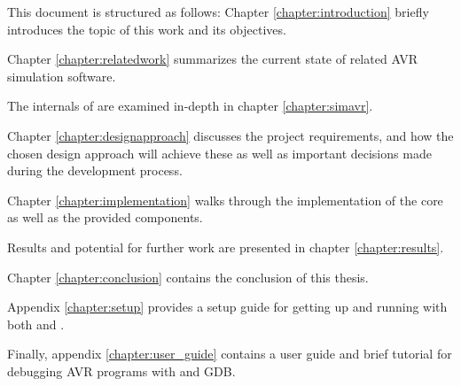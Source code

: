 This document is structured as follows: Chapter \ref{chapter:introduction} briefly
introduces the topic of this work and its objectives.


Chapter \ref{chapter:relatedwork} summarizes the current state of related \ac{AVR}
simulation software.

The internals of \simavr are examined in-depth in chapter \ref{chapter:simavr}.

Chapter \ref{chapter:designapproach} discusses the project requirements, and
how the chosen design approach will achieve these as well as important decisions
made during the development process.

Chapter \ref{chapter:implementation} walks through the implementation of the
\qsimavr core as well as the provided components.

Results and potential for further work are presented in chapter \ref{chapter:results}.

Chapter \ref{chapter:conclusion} contains the conclusion of this thesis.

Appendix \ref{chapter:setup} provides a setup guide for getting up and running
with both \simavr and \qsimavr.

Finally, appendix \ref{chapter:user_guide} contains a \qsimavr user guide
and brief tutorial for debugging \ac{AVR} programs with \qsimavr and \ac{GDB}.
